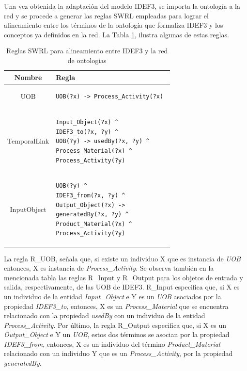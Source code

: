 \documentclass[journal]{IEEEtran}
\begin{document}
Una vez obtenida la adaptaci\'on del modelo IDEF3, se importa la ontolog\'ia a la red y se procede a generar las reglas SWRL empleadas para lograr el alineamiento entre los t\'erminos de la ontolog\'ia que formaliza IDEF3 y los conceptos ya definidos en la red. La Tabla \ref{tabla8}, ilustra algunas de estas reglas.

\begin{table}[!t]
\renewcommand{\arraystretch}{1.3}
\caption{Reglas SWRL para alineamiento entre IDEF3 y la red de ontologias}
\label{tabla8}
\centering
\begin{tabular}{|c|p{6cm}|}
\hline
\bfseries Nombre & \bfseries Regla \\ \hline
UOB          & \begin{verbatim}UOB(?x) -> Process_Activity(?x) \end{verbatim} \\ \cline{1-2}
TemporalLink & \begin{verbatim}Input_Object(?x) ^ 
IDEF3_to(?x, ?y) ^ 
UOB(?y) -> usedBy(?x, ?y) ^ 
Process_Material(?x) ^ 
Process_Activity(?y) \end{verbatim} \\ \cline{1-2}
InputObject  & \begin{verbatim}UOB(?y) ^ 
IDEF3_from(?x, ?y) ^ 
Output_Object(?x) -> 
generatedBy(?x, ?y) ^  
Product_Material(?x) ^ 
Process_Activity(?y) \end{verbatim} \\ \hline   
\end{tabular}
\end{table}

La regla R\_UOB, señala que, si existe un individuo X que es instancia de \emph{UOB} entonces, X es instancia de \emph{Process\_Activity}. Se observa tambi\'en en la mencionada tabla las reglas R\_Input y R\_Output para los objetos de entrada y salida, respectivamente, de las UOB de IDEF3. R\_Input especifica que, si X es un individuo de la entidad \emph{Input\_Object} e Y es un \emph{UOB} asociados por la propiedad \emph{IDEF3\_to}, entonces, X es un \emph{Process\_Material} que se encuentra relacionado con la propiedad \emph{usedBy} con un individuo de la entidad \emph{Process\_Activity}. Por \'ultimo, la regla R\_Output especifica que, si X es un \emph{Output\_Object} e Y un \emph{UOB}, estos dos t\'erminos se asocian por la propiedad \emph{IDEF3\_from}, entonces, X es un individuo del t\'ermino \emph{Product\_Material} relacionado con un individuo Y que es un \emph{Process\_Activity}, por la propiedad \emph{generatedBy}.
\end{document}
